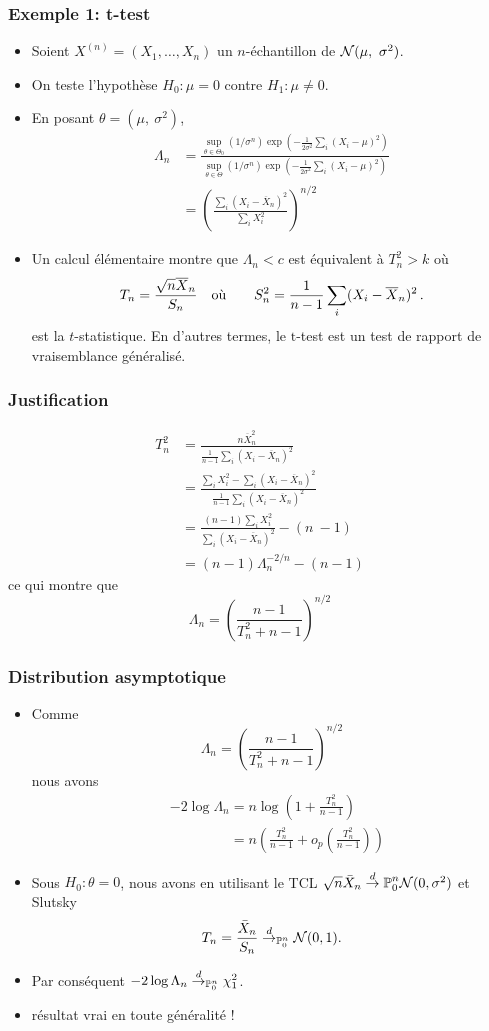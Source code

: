 \begin{frame}
\frametitle{Exemple 1: t-test}
\begin{itemize}
\item  Soient $X^{(n)}= (X_{1}, \dots, X_{n})$ un $n$-échantillon de $\mathcal{N}(\mu,\ \sigma^{2})$.
\item On teste l'hypothèse $H_0: \mu =0$ contre $H_1: \mu \ne 0$.
\item En posant $\theta=(\mu,\ \sigma^{2})$,
\begin{align*}
\Lambda_{n}&=\frac{\sup_{\theta\in\Theta_{0}}(1/\sigma^{n})\exp(-\frac{1}{2\sigma^{2}}\sum_{i}(X_{i}-\mu)^{2})}{\sup_{\theta\in\Theta}(1/\sigma^{n})\exp(-\frac{1}{2\sigma^{2}}\sum_{i}(X_{i}-\mu)^{2})}\\
&=\left( \frac{\sum_{i}(X_{i}-\overline{X}_{n})^{2}}{\sum_{i}X_{i}^{2}} \right)^{n/2}
\end{align*}
\item Un calcul élémentaire montre que $\Lambda_{n}<c$ est équivalent à $T_{n}^{2}>k$ où
$$
T_{n}=\frac{\sqrt{n}\overline{X}_{n}}{S_n}  \quad \text{où} \quad \quad S_n^2= \frac{1}{n-1}\sum_{i}(X_{i}-\overline{X}_{n})^{2} \,.
$$
est la $t$-statistique. En d'autres termes, le $\mathrm{t}$-test est un test de rapport de vraisemblance généralisé.
\end{itemize}
\end{frame}

\begin{frame}
\frametitle{Justification}
\begin{align*}
T_{n}^{2} &=\frac{n\overline{X}_{n}^{2}}{\frac{1}{n-1}\sum_{i}(X_{i}-\overline{X}_{n})^{2}} \\
&=\frac{\sum_{i}X_{i}^{2}-\sum_{i}(X_{i}-\overline{X}_{n})^{2}}{\frac{1}{n-1}\sum_{i}(X_{i}-\overline{X}_{n})^{2}} \\
&=\frac{(n-1)\sum_{i}X_{i}^{2}}{\sum_{i}(X_{i}-\overline{X}_{n})^{2}}-(n\ -1) \\
&=(n-1)\Lambda_{n}^{-2/n}-(n-1)
\end{align*}
ce qui montre que
$$
\Lambda_{n}=\left(\frac{n-1}{T_{n}^{2}+n-1}\right)^{n/2}
$$
\end{frame}

\begin{frame}
\frametitle{Distribution asymptotique}
\begin{itemize}
\item Comme
$$
\Lambda_{n}=(\frac{n-1}{T_{n}^{2}+n-1})^{n/2}
$$
nous avons
\begin{align*}
&-2\log\Lambda_{n}=n\log\left(1+\frac{T_n^{2}}{n-1}\right) \\
&\phantom{-2\log\Lambda_{n}}=n \left(\frac{T_n^{2}}{n-1}+o_{p}(\frac{T_n^{2}}{n-1}) \right) 
\end{align*}
\item Sous $H_{0}: \theta= 0$,  nous avons en utilisant le TCL $\sqrt{n} \bar{X}_n \stackrel{d}{\rightarrow}{\operatorname{{\mathbb P}}_0^n} \mathcal{N}(0,\sigma^2)$ et Slutsky
$$
T_{n} = \frac{\bar{X}_n}{S_n} \stackrel{d}{\rightarrow}_{\operatorname{{\mathbb P}}_0^n} \mathcal{N}(0,1).
$$
\item Par conséquent $-2 \log \Lambda_n \stackrel{d}{\rightarrow}_{\operatorname{{\mathbb P}}_0^n} \chi_{1}^{2}$.
\item \alert{résultat vrai en toute généralité !}
\end{itemize}
\end{frame}

